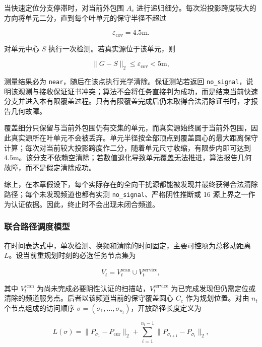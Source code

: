 当快速定位分支停滞时，对当前外包围 $A_c$ 进行递归细分。每次沿投影跨度较大的方向将单元二分，直到每个叶单元的保守半径不超过

\begin{equation}
\varepsilon_{\mathrm{cov}}=4.5\mathrm{m}.
\label{eq:q3_cover_radius}
\end{equation}

对单元中心 $S$ 执行一次检测。若真实源位于该单元，则

\begin{equation}
\lVert G-S\rVert_2\le\varepsilon_{\mathrm{cov}}<5\mathrm{m},
\label{eq:q3_near_guarantee}
\end{equation}

测量结果必为 \texttt{near}，随后在该点执行光学清除。保证测站若返回 \texttt{no\_signal}，说明该观测与接收保证证书冲突；算法不会将任务直接判为成功，而是结束当前快速分支并进入本有限覆盖过程。只有有限覆盖完成后仍未取得合法清除证书时，才报告几何故障。

覆盖细分只保留与当前外包围仍有交集的单元，而真实源始终属于当前外包围，因此真实源所在叶单元不会被丢弃。单元半径按全部顶点到覆盖圆心的最大距离保守计算；每次对当前较大投影跨度作二分，随着单元尺寸收缩，有限步内即可达到 $4.5\mathrm{m}$。该分支不依赖空清除；若数值退化导致单元覆盖无法推进，算法报告几何故障，而不是假定清除成功。

综上，在本章假设下，每个实际存在的全向干扰源都能被发现并最终获得合法清除路径；每个未发现频道也都有实测 \texttt{no\_signal}、严格阴性推断或 16 源上界之一作为认证依据。因此，终止时不会出现未闭合频道。

\subsubsection{联合路径调度模型}

在时间表达式中，单次检测、换频和清除的时间固定，主要可控项为总移动距离 $L$。设当前重规划时刻的必选任务节点集为

\begin{equation}
V_t=V_t^{\mathrm{scan}}\cup V_t^{\mathrm{service}},
\label{eq:q3_task_nodes}
\end{equation}

其中 $V_t^{\mathrm{scan}}$ 为尚未完成必要阴性认证的扫描站，$V_t^{\mathrm{service}}$ 为已完成发现但仍需定位或清除的频道服务点。后者以该频道当前的保守覆盖圆心 $C_c$ 作为规划位置。对由 $n_t$ 个节点组成的访问顺序 $\sigma=(\sigma_1,\ldots,\sigma_{n_t})$，开放路径长度定义为

\begin{equation}
L(\sigma)
=
\lVert P_{\sigma_1}-P_{\mathrm{cur}}\rVert_2
+
\sum_{i=1}^{n_t-1}
\lVert P_{\sigma_{i+1}}-P_{\sigma_i}\rVert_2,
\label{eq:q3_open_path}
\end{equation}


